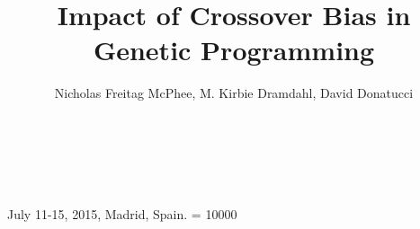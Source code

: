 \documentclass{sig-alternate}
\begin{document}
 {July 11-15, 2015, Madrid, Spain.}
\widowpenalty = 10000
    
\title{Impact of Crossover Bias in Genetic Programming}

\author{
\alignauthor
Nicholas Freitag McPhee, M. Kirbie Dramdahl, David Donatucci\\
	\\
	\\
	\\
}



\date{} 
    
\maketitle
\end{document}
